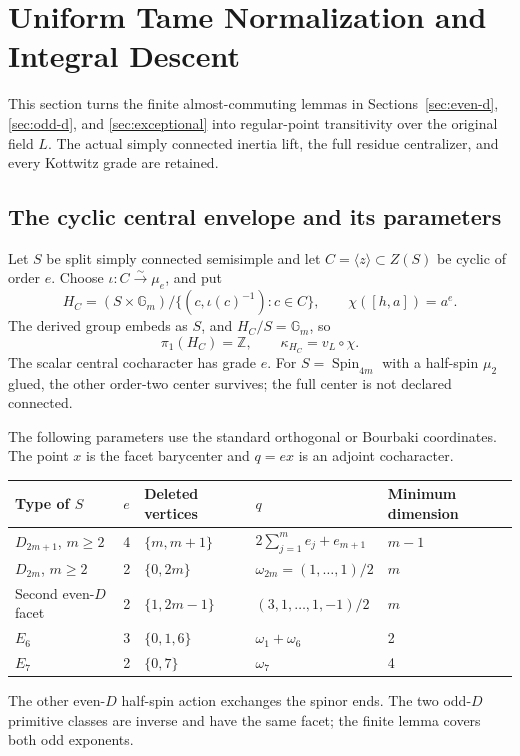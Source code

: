 \documentclass[11pt,a4paper]{article}
\theoremstyle{definition}
\theoremstyle{remark}
\begin{document}
\section{Uniform Tame Normalization and Integral Descent}
\label{sec:tame-descent}

This section turns the finite almost-commuting lemmas in
Sections~\ref{sec:even-d}, \ref{sec:odd-d}, and \ref{sec:exceptional}
into regular-point transitivity over the original field \(L\).
The actual simply connected inertia lift, the full residue
centralizer, and every Kottwitz grade are retained.

\subsection{The cyclic central envelope and its parameters}
Let \(S\) be split simply connected semisimple and let
\(C=\langle z\rangle\subset Z(S)\) be cyclic of order \(e\).
Choose \(\iota:C\overset\sim\to\mu_e\), and put
\[
H_C=(S\times\mathbb G_m)/
\{(c,\iota(c)^{-1}):c\in C\},\qquad
\chi([h,a])=a^e.
\]
The derived group embeds as \(S\), and \(H_C/S=\mathbb G_m\), so
\[
\pi_1(H_C)=\mathbb Z,\qquad \kappa_{H_C}=v_L\circ\chi.
\]
The scalar central cocharacter has grade \(e\). For
\(S=\operatorname{Spin}_{4m}\) with a half-spin \(\mu_2\) glued, the
other order-two center survives; the full center is not declared
connected.

The following parameters use the standard orthogonal or Bourbaki
coordinates. The point \(x\) is the facet barycenter and \(q=ex\)
is an adjoint cocharacter.

\begin{longtable}{@{}p{.16\linewidth}p{.04\linewidth}
 p{.16\linewidth}p{.40\linewidth}p{.10\linewidth}@{}}
\toprule
Type of \(S\)&\(e\)&Deleted vertices&\(q\)&Minimum dimension\\
\midrule
\endhead
\(D_{2m+1}\), \(m\ge2\)&4&\(\{m,m+1\}\)&
 \(2\sum_{j=1}^{m}e_j+e_{m+1}\)&\(m-1\)\\
\(D_{2m}\), \(m\ge2\)&2&\(\{0,2m\}\)&
 \(\omega_{2m}=(1,\ldots,1)/2\)&\(m\)\\
Second even-\(D\) facet&2&\(\{1,2m-1\}\)&
 \((3,1,\ldots,1,-1)/2\)&\(m\)\\
\(E_6\)&3&\(\{0,1,6\}\)&\(\omega_1+\omega_6\)&2\\
\(E_7\)&2&\(\{0,7\}\)&\(\omega_7\)&4\\
\bottomrule
\end{longtable}
The other even-\(D\) half-spin action exchanges the spinor ends.
The two odd-\(D\) primitive classes are inverse and have the same
facet; the finite lemma covers both odd exponents.
\end{document}
